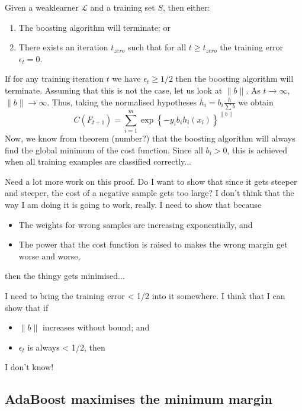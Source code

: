\begin{theorem}
Given a weaklearner $\mathcal{L}$ and a training set $S$,
then either:
\begin{enumerate}
\item	The boosting algorithm will terminate; or
\item	There exists an iteration $t_{zero}$ such that for all $t \geq
	t_{zero}$ the training error $\epsilon_t = 0$.
\end{enumerate}

\proof If for any training iteration $t$ we have $\epsilon_t \geq 1/2$
then the boosting algorithm will terminate.  Assuming that this is not the
case, let us look at $\|b\|$.  As $t \rightarrow \infty$, $\|b\|
\rightarrow \infty$.  Thus, taking the normalised hypotheses $\bar{h}_i
= b_i \frac{h}{\sum b}$ we obtain
\[
C(F_{t+1}) = \sum_{i=1}^{m} \exp\left\{ -y_i b_i h_i(x_i)
\right\}^{\|b\|}
\]
Now, we know from theorem (number?) that the boosting algorithm will
always find the global minimum of the cost function.  Since all $b_i >
0$, this is achieved when all training examples are classified
correctly...

Need a lot more work on this proof.  Do I want to show that since it
gets steeper and steeper, the cost of a negative sample gets too
large?  I don't think that the way I am doing it is going to work,
really.  I need to show that because
\begin{itemize}
\item	The weights for wrong samples are increasing exponentially,
	and
\item	The power that the cost function is raised to makes the wrong
	margin get worse and worse,
\end{itemize}
then the thingy gets minimised...

I need to bring the training error < 1/2 into it somewhere.  I think
that I can show that if
\begin{itemize}
\item	$\|b\|$ increases without bound; and
\item	$\epsilon_t$ is always < 1/2, then
\end{itemize}
I don't know!

\end{theorem}



\subsection{AdaBoost maximises the minimum margin}

